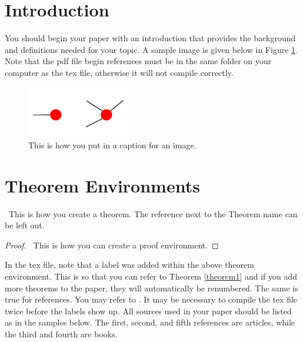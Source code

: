 \documentclass[10pt]{amsart}
\begin{document}
\maketitle





\section{Introduction}

You should begin your paper with an introduction that provides the background and definitions needed for your topic.  A sample image is given below in Figure \ref{picture}.  Note that the pdf file begin references must be in the same folder on your computer as the tex file, otherwise it will not compile correctly.


\begin{figure}[h!]
\centerline{
{\includegraphics[width=0.4\textwidth]{pictures/bad_examples.pdf}}}\caption{This is how you put in a caption for an image.}\label{picture}
\end{figure} 

\section{Theorem Environments}

\begin{theorem}[Ramsey, 1930] \ This is how you create a theorem. The reference next to the Theorem name can be left out.  \label{theorem1}
\end{theorem}

\begin{proof} \ This is how you can create a proof environment.  \end{proof}

In the tex file, note that a label was added within the above theorem environment.  This is so that you can refer to Theorem \ref{theorem1} and if you add more theorems to the paper, they will automatically be renumbered.  The same is true for references.  You may refer to \cite{R}.  It may be necessary to compile the tex file twice before the labels show up.  All sources used in your paper should be listed as in the samples below.  The first, second, and fifth references are articles, while the third and fourth are books.
\end{document}
